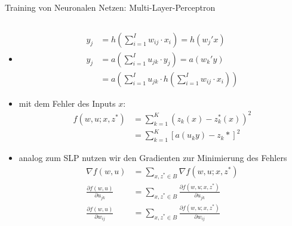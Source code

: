 \documentclass[aspectratio=1610, xcolor=dvipsnames, 9pt]{beamer}
\begin{document}
      \begin{frame}{Training von Neuronalen Netzen: Multi-Layer-Perceptron}
        \begin{columns}
          \begin{column}{1\textwidth}
            \begin{itemize}
              \item
              \begin{align*}
                y_j &= h \left( \sum_{i=1}^I w_{ij} \cdot x_i \right) = h(w_j'x) \\
                y_j &= a \left( \sum_{i=1}^I u_{jk} \cdot y_j \right) = a(w_k'y) \\
                    &= a \left(  \sum_{i=1}^I u_{jk} \cdot  h \left( \sum_{i=1}^I w_{ij} \cdot x_i \right)   \right)
              \end{align*} 
              \item mit dem Fehler des Inputs $x$:
              \begin{align*}
                f(w,u;x,z^*) &= \sum_{k=1}^K (z_k(x) -z^*_k(x) )^2 \\
                            &=  \sum_{k=1}^K [a(u_k y) - z_k*]^2
              \end{align*}
            \item analog zum SLP nutzen wir den Gradienten zur Minimierung des Fehlers
            \begin{align*}
              \nabla f(w,u) &= \sum_{x,z^* \in B} \nabla f(w, u; x,z^*) \\
              \frac{\partial f(w,u)}{\partial u_{jk}} &= \sum_{x,z^* \in B} \frac{\partial f(w,u;x,z^*)}{\partial u_{jk}} \\
              \frac{\partial f(w,u)}{\partial w_{ij}} &= \sum_{x,z^* \in B} \frac{\partial f(w,u;x,z^*)}{\partial w_{ij}} 
            \end{align*}
            \end{itemize}
          \end{column}
        \end{columns}
      \end{frame}
\end{document}
